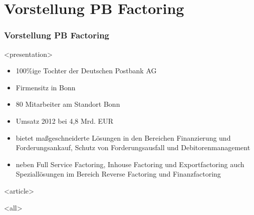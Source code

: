 
\section{Vorstellung PB Factoring}

\begin{frame}[fragile]
\frametitle<presentation>{Vorstellung PB Factoring}




\mode
<presentation>
\begin{itemize}
 \item 100\%ige Tochter der Deutschen Postbank AG
 \item Firmensitz in Bonn
 \item 80 Mitarbeiter am Standort Bonn
 \item Umsatz 2012 bei 4,8 Mrd. EUR
 \item bietet maßgeschneiderte Lösungen in den Bereichen Finanzierung und Forderungsankauf, Schutz von Forderungsausfall und Debitorenmanagement
 \item neben Full Service Factoring, Inhouse Factoring und Exportfactoring auch Speziallösungen im Bereich Reverse Factoring und Finanzfactoring
\end{itemize}

\mode
<article>


\mode
<all>

\end{frame}
\newpage
\clearpage